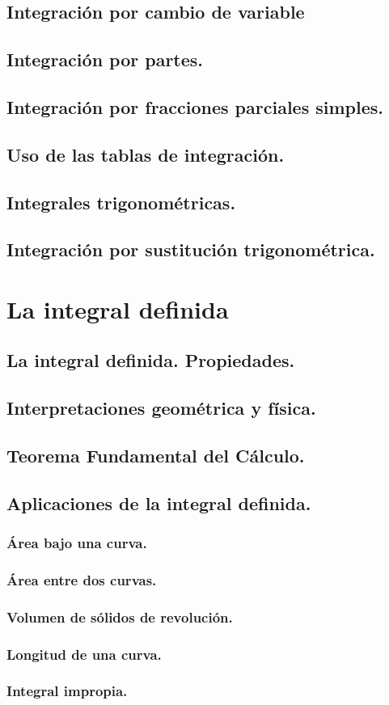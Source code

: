 \subsection{Integración por cambio de variable}
\subsection{Integración por partes.}
\subsection{Integración por fracciones parciales simples.}
\subsection{Uso de las tablas de integración.}
\subsection{Integrales trigonométricas.}
\subsection{Integración por sustitución trigonométrica.}



\section{La integral definida}%
\subsection{La integral definida. Propiedades.}
\subsection{Interpretaciones geométrica y física.}
\subsection{Teorema Fundamental del Cálculo.}
\subsection{Aplicaciones de la integral definida.}
\subsubsection{Área bajo una curva.}
\subsubsection{Área entre dos curvas.}
\subsubsection{Volumen de sólidos de revolución.}
\subsubsection{Longitud de una curva.}
\subsubsection{Integral impropia.}
